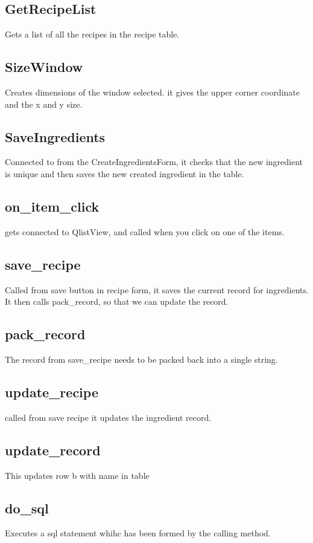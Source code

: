 \documentclass[12pt]{article}
\begin{document}
\subsection{GetRecipeList}
Gets a list of all the recipes in the recipe table.

\subsection{SizeWindow}
Creates dimensions of the window selected. it gives the upper corner coordinate and the x and y size.

\subsection{SaveIngredients}
Connected to from the CreateIngredientsForm, it checks that the new ingredient is unique and then saves the new created ingredient in the table.

\subsection{on\_item\_click}
gets connected to QlistView, and called when you click on one of the items.

\subsection{save\_recipe}
Called from save button in recipe form, it saves the current record for ingredients. It then calls pack\_record, so that we can update the record.

\subsection{pack\_record}
The record from save\_recipe needs to be packed back into a single string.

\subsection{update\_recipe}
called from save recipe it updates the ingredient record.

\subsection{update\_record}
This updates   row b with name in table

\subsection{do\_sql}
Executes a sql statement whihc has been formed by the calling method.
\end{document}
